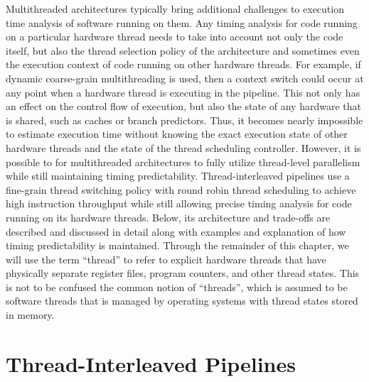 Multithreaded architectures typically bring additional challenges to execution time analysis of software running on them.
Any timing analysis for code running on a particular hardware thread needs to take into account not only the code itself, but also the thread selection policy of the architecture and sometimes even the execution context of code running on other hardware threads.
For example, if dynamic coarse-grain multithreading is used, then a context switch could occur at any point when a hardware thread is executing in the pipeline.
This not only has an effect on the control flow of execution, but also the state of any hardware that is shared, such as caches or branch predictors.    
Thus, it becomes nearly impossible to estimate execution time without knowing the exact execution state of other hardware threads and the state of the thread scheduling controller.
However, it is possible to for multithreaded architectures to fully utilize thread-level parallelism while still maintaining timing predictability.
Thread-interleaved pipelines use a fine-grain thread switching policy with round robin thread scheduling to achieve high instruction throughput while still allowing precise timing analysis for code running on its hardware threads. 
Below, its architecture and trade-offs are described and discussed in detail along with examples and explanation of how timing predictability is maintained.
Through the remainder of this chapter, we will use the term ``thread'' to refer to explicit hardware threads that have physically separate register files, program counters, and other thread states.
This is not to be confused the common notion of ``threads'', which is assumed to be software threads that is managed by operating systems with thread states stored in memory.

\section{Thread-Interleaved Pipelines}
\label{section:pret_thread_pipeline}


